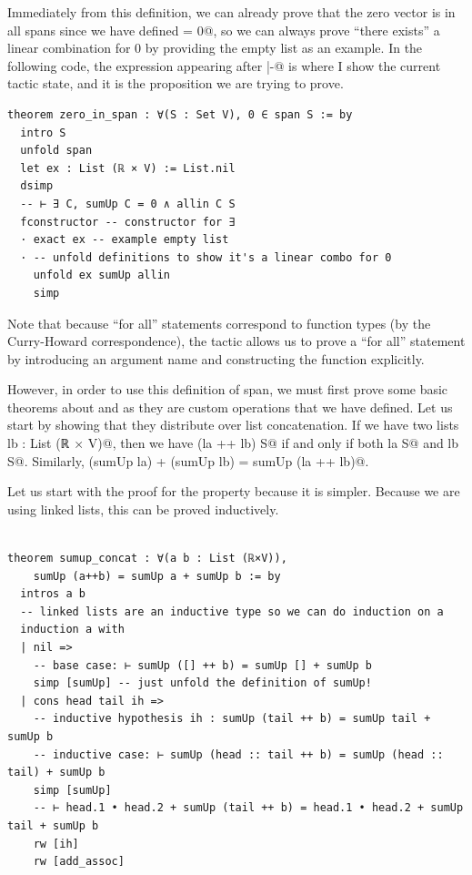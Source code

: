 \documentclass{article}
\begin{document}
Immediately from this definition, we can already prove that the zero vector is in all spans since we have defined \lstinline@sumUp [] = 0@, so we can always prove ``there exists'' a linear combination for $0$ by providing the empty list as an example. In the following code, the expression appearing after \lstinline@|-@ is where I show the current tactic state, and it is the proposition we are trying to prove.

\begin{lstlisting}
theorem zero_in_span : ∀(S : Set V), 0 ∈ span S := by
  intro S
  unfold span
  let ex : List (ℝ × V) := List.nil
  dsimp
  -- ⊢ ∃ C, sumUp C = 0 ∧ allin C S
  fconstructor -- constructor for ∃
  · exact ex -- example empty list
  · -- unfold definitions to show it's a linear combo for 0
    unfold ex sumUp allin
    simp
\end{lstlisting}

Note that because ``for all'' statements correspond to function types (by the Curry-Howard correspondence), the \lstinline@intro@ tactic allows us to prove a ``for all'' statement by introducing an argument name and constructing the function explicitly.

However, in order to use this definition of span, we must first prove some basic theorems about \lstinline@allin@ and \lstinline@sumUp@ as they are custom operations that we have defined. Let us start by showing that they distribute over list concatenation. If we have two lists \lstinline@la lb : List (ℝ × V)@, then we have \lstinline@allin (la ++ lb) S@ if and only if both \lstinline@allin la S@ and \lstinline@allin lb S@. Similarly, \lstinline@(sumUp la) + (sumUp lb) = sumUp (la ++ lb)@.

Let us start with the proof for the \lstinline@sumUp@ property because it is simpler. Because we are using linked lists, this can be proved inductively.

\begin{lstlisting}

theorem sumup_concat : ∀(a b : List (ℝ×V)),
    sumUp (a++b) = sumUp a + sumUp b := by
  intros a b
  -- linked lists are an inductive type so we can do induction on a
  induction a with
  | nil => 
    -- base case: ⊢ sumUp ([] ++ b) = sumUp [] + sumUp b
    simp [sumUp] -- just unfold the definition of sumUp!
  | cons head tail ih =>
    -- inductive hypothesis ih : sumUp (tail ++ b) = sumUp tail + sumUp b
    -- inductive case: ⊢ sumUp (head :: tail ++ b) = sumUp (head :: tail) + sumUp b
    simp [sumUp]
    -- ⊢ head.1 • head.2 + sumUp (tail ++ b) = head.1 • head.2 + sumUp tail + sumUp b
    rw [ih]
    rw [add_assoc]
\end{lstlisting}
\end{document}
